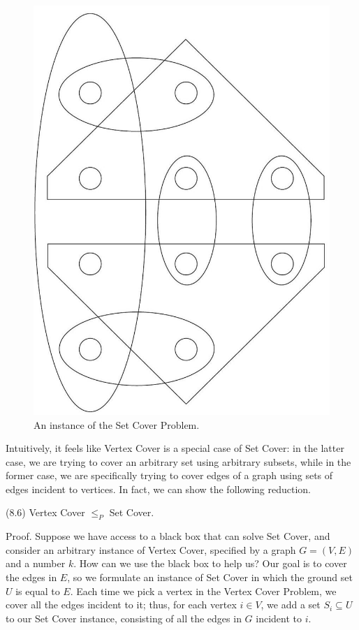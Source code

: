 \documentclass[a4paper, 12pt]{book}
\theoremstyle{dotless}
\begin{document}
\begin{figure}
    \centering
\includegraphics[width=\textwidth]{Imagenes-Seccion8/2023_01_31_032b090513e1f42dd22ag-07}
    \caption{An instance of the Set Cover Problem.}
    \label{fig:8_2}
\end{figure}

\begin{center}
\end{center}


Intuitively, it feels like Vertex Cover is a special case of Set Cover: in the latter case, we are trying to cover an arbitrary set using arbitrary subsets, while in the former case, we are specifically trying to cover edges of a graph using sets of edges incident to vertices. In fact, we can show the following reduction.

(8.6) Vertex Cover $\leq_{P}$ Set Cover.

Proof. Suppose we have access to a black box that can solve Set Cover, and consider an arbitrary instance of Vertex Cover, specified by a graph $G=(V, E)$ and a number $k$. How can we use the black box to help us? Our goal is to cover the edges in $E$, so we formulate an instance of Set Cover in which the ground set $U$ is equal to $E$. Each time we pick a vertex in the Vertex Cover Problem, we cover all the edges incident to it; thus, for each vertex $i \in V$, we add a set $S_{i} \subseteq U$ to our Set Cover instance, consisting of all the edges in $G$ incident to $i$.
\end{document}
